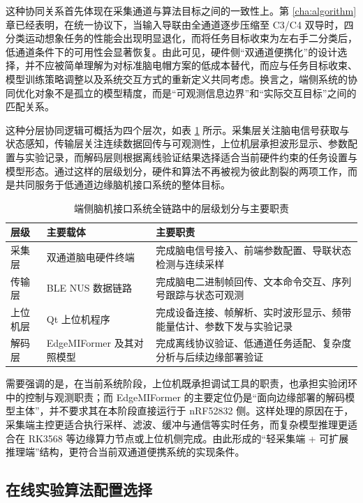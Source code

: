 这种协同关系首先体现在采集通道与算法目标之间的一致性上。第 \ref{cha:algorithm} 章已经表明，在统一协议下，当输入导联由全通道逐步压缩至 C3/C4 双导时，四分类运动想象任务的性能会出现明显退化，而将任务目标收束为左右手二分类后，低通道条件下的可用性会显著恢复。由此可见，硬件侧“双通道便携化”的设计选择，并不应被简单理解为对标准脑电帽方案的低成本替代，而应与任务目标收束、模型训练策略调整以及系统交互方式的重新定义共同考虑。换言之，端侧系统的协同优化对象不是孤立的模型精度，而是“可观测信息边界”和“实际交互目标”之间的匹配关系。

这种分层协同逻辑可概括为四个层次，如表 \ref{tab:c5_end2end_layers} 所示。采集层关注脑电信号获取与状态感知，传输层关注连续数据回传与可观测性，上位机层承担波形显示、参数配置与实验记录，而解码层则根据离线验证结果选择适合当前硬件约束的任务设置与模型形态。通过这样的层级划分，硬件和算法不再被视为彼此割裂的两项工作，而是共同服务于低通道边缘脑机接口系统的整体目标。

\begin{table}[htbp]
    \centering
    \caption{端侧脑机接口系统全链路中的层级划分与主要职责}
    \label{tab:c5_end2end_layers}
    \begin{tabular}{p{2.8cm}p{4.0cm}p{6.3cm}}
        \hline
        层级 & 主要载体 & 主要职责 \\
        \hline
        采集层 & 双通道脑电硬件终端 & 完成脑电信号接入、前端参数配置、导联状态检测与连续采样 \\
        传输层 & BLE NUS 数据链路 & 完成脑电二进制帧回传、文本命令交互、序列号跟踪与状态可观测 \\
        上位机层 & Qt 上位机程序 & 完成设备连接、帧解析、实时波形显示、频带能量估计、参数下发与实验记录 \\
        解码层 & EdgeMIFormer 及其对照模型 & 完成离线协议验证、低通道任务适配、复杂度分析与后续边缘部署验证 \\
        \hline
    \end{tabular}
\end{table}

需要强调的是，在当前系统阶段，上位机既承担调试工具的职责，也承担实验闭环中的控制与观测职责；而 EdgeMIFormer 的主要定位仍是“面向边缘部署的解码模型主体”，并不要求其在本阶段直接运行于 nRF52832 侧。这样处理的原因在于，采集端主控更适合执行采样、滤波、缓冲与通信等实时任务，而复杂模型推理更适合在 RK3568 等边缘算力节点或上位机侧完成。由此形成的“轻采集端 + 可扩展推理端”结构，更符合当前双通道便携系统的实现条件。

\subsection{在线实验算法配置选择}


